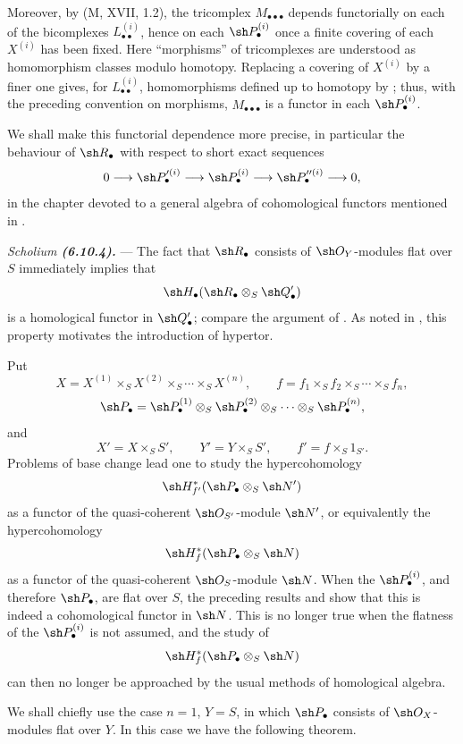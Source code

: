\begin{remarks}[6.10.3]
Moreover, by (M, XVII, 1.2), the tricomplex
$M_{\bullet\bullet\bullet}$ depends functorially on each of the
bicomplexes $L_{\bullet\bullet}^{(i)}$, hence on each
$\sh P_\bullet^{(i)}$ once a finite covering of each
$X^{(i)}$ has been fixed.  Here ``morphisms'' of tricomplexes
are understood as homomorphism classes modulo homotopy.
Replacing a covering of $X^{(i)}$ by a finer one gives, for
$L_{\bullet\bullet}^{(i)}$, homomorphisms defined up to homotopy
by ; thus, with the preceding convention on
morphisms, $M_{\bullet\bullet\bullet}$ is a functor in each
$\sh P_\bullet^{(i)}$.

We shall make this functorial dependence more precise, in
particular the behaviour of $\sh R_\bullet$ with respect to
short exact sequences
\[
  0\longrightarrow\sh P_\bullet^{\prime(i)}
  \longrightarrow\sh P_\bullet^{(i)}
  \longrightarrow\sh P_\bullet^{\prime\prime(i)}
  \longrightarrow0,
\]
in the chapter devoted to a general algebra of cohomological
functors mentioned in .
\end{remarks}

\begin{env}[6.10.4]
\label{III.6.10.4}
\emph{Scholium \textbf{(6.10.4).}} ---
The fact that $\sh R_\bullet$ consists of $\sh O_Y$-modules
flat over $S$ immediately implies that
\[
  \sh H_\bullet
  (\sh R_\bullet\otimes_S\sh Q_\bullet')
\]
is a homological functor in $\sh Q_\bullet'$; compare the
argument of .  As noted in
, this property motivates the introduction of
hypertor.

Put
\[
  X=X^{(1)}\times_SX^{(2)}\times_S\cdots\times_SX^{(n)},
  \qquad
  f=f_1\times_Sf_2\times_S\cdots\times_Sf_n,
\]
\[
  \sh P_\bullet
  =
  \sh P_\bullet^{(1)}
  \otimes_S\sh P_\bullet^{(2)}
  \otimes_S\cdots\otimes_S\sh P_\bullet^{(n)},
\]
and
\[
  X'=X\times_SS',
  \qquad
  Y'=Y\times_SS',
  \qquad
  f'=f\times_S1_{S'}.
\]
Problems of base change lead one to study the hypercohomology
\[
  \sh H^*_{f'}
  (\sh P_\bullet\otimes_S\sh N')
\]
as a functor of the quasi-coherent $\sh O_{S'}$-module
$\sh N'$, or equivalently the hypercohomology
\[
  \sh H^*_f
  (\sh P_\bullet\otimes_S\sh N)
\]
as a functor of the quasi-coherent $\sh O_S$-module $\sh N$.
When the $\sh P_\bullet^{(i)}$, and therefore
$\sh P_\bullet$, are flat over $S$, the preceding results and
 show that this is indeed a cohomological
functor in $\sh N$.  This is no longer true when the flatness
of the $\sh P_\bullet^{(i)}$ is not assumed, and the study of
\[
  \sh H^*_f(\sh P_\bullet\otimes_S\sh N)
\]
can then no longer be approached by the usual methods of
homological algebra.

We shall chiefly use the case $n=1$, $Y=S$, in which
$\sh P_\bullet$ consists of $\sh O_X$-modules flat over $Y$.
In this case we have the following theorem.
\end{env}


